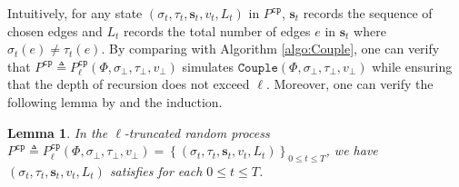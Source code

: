 \documentclass[11pt]{article}
\newtheorem{lemma}[theorem]{Lemma}
\newtheorem{corollary}[theorem]{Corollary}
\newcommand{\set}[1]{\left\{#1\right\}}
\def\!#1{\mathtt{#1}}
\newcommand{\seqS}{\boldsymbol{s}}
\begin{document}
Intuitively, for any state $(\sigma_t, \tau_t, \seqS_t, v_t, L_t)$ in $P^{\!{cp}}$, $\seqS_t$ records the sequence of chosen edges and $L_t$ records the total number of edges $e$ in $\seqS_t$ where $\sigma_t(e)\neq \tau_t(e)$.
By comparing  with Algorithm \ref{algo:Couple}, one can verify that $P^{\!{cp}} \triangleq P^{\!{cp}}_\ell(\Phi, \sigma_\bot, \tau_\bot, v_\bot)$ simulates $\!{Couple}(\Phi, \sigma_\bot, \tau_\bot, v_\bot)$ while ensuring that the depth of recursion does not exceed $\ell$.
Moreover, one can verify the following lemma by  and the induction.



\begin{lemma}\label{lemma-trp-correctness}
In the $\ell$-truncated random process $P^{\!{cp}} \triangleq P^{\!{cp}}_\ell(\Phi, \sigma_\bot, \tau_\bot, v_\bot) = \set{(\sigma_t, \tau_t, \seqS_t, v_t, L_t)}_{0\leq t \leq T}$, we have 
$(\sigma_t, \tau_t,\seqS_t, v_t, L_t)$ satisfies  for each $0\leq t \leq T$.
\end{lemma}



\end{document}
